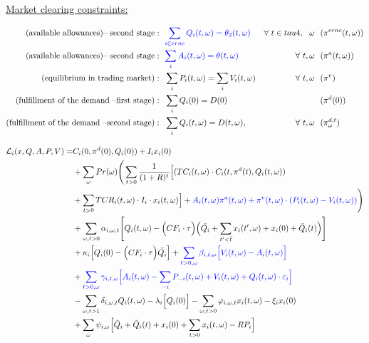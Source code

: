 \documentclass[11pt, letterpaper]{article}
\newcommand{\pia}{\textcolor[rgb]{0,0,1}}
\begin{document}
\underline{Market clearing constraints:}

\begin{align}
\textrm{(available allowances)-- second stage}: &  \ \ \pia{ \sum_{i \in ernc} Q_i(t,\omega) = \theta_2(t,\omega)}    &   \forall \ t\in tau4, \ \ \omega & \ \ (\pi^{ernc}(t,\omega))\\
\textrm{(available allowances)-- second stage}: &  \ \ \pia{  \sum_{i} A_{i}(t,\omega) = \theta(t,\omega) }  &   \forall \ t,\omega & \ \ (\pi^{a}(t,\omega))\\
\textrm{(equilibrium in trading market)}: &   \ \  \sum_{i} P_i(t,\omega) = \sum_{i} V_i(t,\omega) & \forall \ t,\omega & \ \ (\pi^{v}) \\
\textrm{(fulfillment of the demand --first stage)}:  &   \ \  \sum_{i} Q_i(0) = D(0) &  & \ \ (\pi^d(0))\\
\textrm{(fulfillment of the demand --second stage)}:  &   \ \  \sum_{i} Q_i(t,\omega) = D(t,\omega), & \forall \ t,\omega & \ \ (\pi^{d,t}_\omega)
\end{align}


\begin{align}
    \mathcal{L}_i(x,Q,A,P,V) = &  C_i(0, \pi^d(0),Q_i(0))+  I_i x_i(0)  \nonumber \\ & +\sum_{\omega} Pr(\omega) \Bigg( \sum_{t>0} \frac{1}{(1+R)^t} \Big[ (TC_i(t,\omega)\cdot C_i(t,\pi^d(t),Q_i(t,\omega) )  \nonumber \\
 & + \sum_{t > 0} TCR_i(t,\omega) \cdot I_i\cdot x_i(t,\omega) \Big] + \pia{A_i(t,\omega)\pi^a(t,\omega)+\pi^v(t,\omega)\cdot \left(P_i(t,\omega)-V_i(t,\omega)\right) }\Bigg) \nonumber \\
 & +\sum_{\omega,t>0} \alpha_{i,\omega,t}\Bigg[  Q_i(t,\omega) - \Big(CF_i \cdot\tau\Big)  \Big(\bar{Q_i} + \sum_{t^{\prime}<\bar{t}} x_i(t^\prime,\omega) + x_i(0)+ \bar{Q}_i(t) \Big) \Bigg] \nonumber \\
 & +  \kappa_{i}\Big[Q_{i}(0)-\Big(CF_i\cdot\tau \Big)\bar{Q_i}\Big]  + \pia{\sum_{t>0,\omega}\beta_{i,t,\omega}\Big[  V_i(t,\omega)- A_i(t,\omega) \Big] }\nonumber \\
 & + \pia{\sum_{t>0,\omega}\gamma_{i,t,\omega} \Big[A_i(t,\omega) - \sum_{-i}P_{-i}(t,\omega) + V_i(t,\omega)+Q_i(t, \omega)\cdot \varepsilon_{i}\Big]} \nonumber\\
     & - \sum_{\omega, t>1}\delta_{i,\omega,t} Q_i(t,\omega) - \lambda_{i}\Big[Q_i(0)\Big] - \sum_{\omega, t>0}\varphi_{i,\omega,t} x_i(t,\omega) - \xi_i x_i(0) \nonumber \\
     & + \sum_{\omega}\psi_{i,\omega} \Big[  \bar{Q}_i+\bar{Q}_i(t) + x_i(0)  + \sum_{t > 0} x_i(t,\omega) - RP_i \Big]
\end{align}
\end{document}
